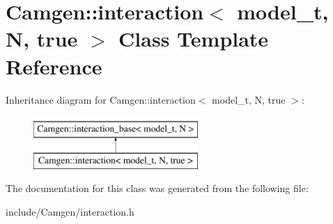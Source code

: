 \hypertarget{a00315}{}\section{Camgen\+:\+:interaction$<$ model\+\_\+t, N, true $>$ Class Template Reference}
\label{a00315}
Inheritance diagram for Camgen\+:\+:interaction$<$ model\+\_\+t, N, true $>$\+:\begin{figure}[H]
\begin{center}
\leavevmode
\includegraphics[height=2.000000cm]{a00315}
\end{center}
\end{figure}


The documentation for this class was generated from the following file\+:\begin{DoxyCompactItemize}
\item 
include/\+Camgen/interaction.\+h\end{DoxyCompactItemize}

